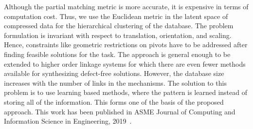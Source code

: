 Although the partial matching metric is more accurate, it is expensive in terms of computation cost.
Thus, we use the Euclidean metric in the latent space of compressed data for the hierarchical clustering of the database.
The problem formulation is invariant with respect to translation, orientation, and scaling.
Hence, constraints like geometric restrictions on pivots have to be addressed after finding feasible solutions for the task.
The approach is general enough to be extended to higher order linkage systems for which there are even fewer methods available for synthesizing defect-free solutions.
However, the database size increases with the number of links in the mechanisms.
The solution to this problem is to use learning based methods, where the pattern is learned instead of storing all of the information.
This forms one of the basis of the proposed approach.
This work has been published in ASME Journal of Computing and Information Science in Engineering, 2019~\cite{Deshpande2019}.
